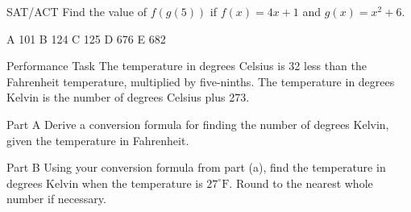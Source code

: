 \documentclass{article}
\newenvironment{practice}[2]{}{}        %
\newcommand{\answer}[1]{}               %
\begin{document}
\begin{practice}{35}{1}
SAT/ACT Find the value of \(f(g(5))\) if \(f(x)=4x+1\) and \(g(x)=x^2+6\).

A 101 \qquad B 124 \qquad C 125 \qquad D 676 \qquad E 682

\answer{125.}
\end{practice}

\begin{practice}{36}{2}
Performance Task The temperature in degrees Celsius is 32 less than the Fahrenheit temperature, multiplied by five-ninths. The temperature in degrees Kelvin is the number of degrees Celsius plus 273.


Part A Derive a conversion formula for finding the number of degrees Kelvin, given the temperature in Fahrenheit.

Part B Using your conversion formula from part (a), find the temperature in degrees Kelvin when the temperature is \(27^{\circ}\mathrm{F}\). Round to the nearest whole number if necessary.

\answer{Part A \(K=\frac{5}{9}(F-32)+273\). Part B \(270\text{ K}\).}
\end{practice}
\end{document}
